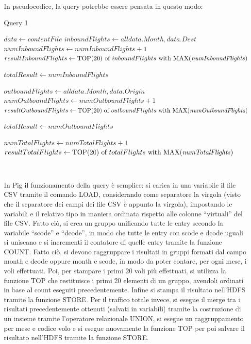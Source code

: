 \documentclass[11pt]{article} %
\begin{document}
In pseudocodice, la query potrebbe essere pensata in questo modo:



\begin{algorithm}
\caption{Query 1}\label{euclid}
\begin{algorithmic}[0]
\State $data \gets contentFile$
\State $inboundFlights \gets all data.Month, data.Dest$
\State $numInboundFlights \gets numInboundFlights+1$
\EndFor
\State $resultInboundFlights \gets \text{TOP(20) of }inboundFlights \text{ with MAX(\textit{numInboundFlights})}$

\State $totalResult \gets numInboundFlights$

\State $outboundFlights \gets all data.Month, data.Origin$
\State $numOutboundFlights \gets numOutboundFlights+1$
\EndFor
\State $resultOutboundFlights \gets \text{TOP(20) of }outboundFlights \text{ with MAX(\textit{numOutboundFlights})}$

\State $totalResult \gets numOutboundFlights$

\State $numTotalFlights \gets numTotalFlights+1$
\EndFor
\State $resultTotalFlights \gets \text{TOP(20) of }totalFlights \text{ with MAX(\textit{numTotalFlights})}$

\end{algorithmic}
\end{algorithm}

~

In Pig il funzionamento della query è semplice: si carica in una variabile il file CSV tramite il comando LOAD, considerando come separatore la virgola (visto che il separatore dei campi dei file CSV è appunto la virgola), impostando le variabili e il relativo tipo in maniera ordinata rispetto alle colonne ``virtuali'' del file CSV. Fatto ciò, si crea un gruppo unificando tutte le entry secondo la variabile ``scode'' e ``dcode'', in modo che tutte le entry con scode e dcode uguali si uniscano e si incrementi il contatore di quelle entry tramite la funzione COUNT. Fatto ciò, si devono raggruppare i risultati in gruppi formati dal campo month e dcode oppure month e scode, in modo da poter contare, per ogni mese, i voli effettuati. Poi, per stampare i primi 20 voli più effettuati, si utilizza la funzione TOP che restituisce i primi 20 elementi di un gruppo, avendoli ordinati in base al count eseguiti precedentemente. Infine si stampa il risultato nell'HDFS tramite la funzione STORE. Per il traffico totale invece, si esegue il merge tra i risultati precedentemente ottenuti (salvati in variabili) tramite la costruzione di un insieme tramite l'operatore relazionale UNION, si esegue un raggruppamento per mese e codice volo e si esegue nuovamente la funzione TOP per poi salvare il risultato nell'HDFS tramite la funzione STORE.
\end{document}
